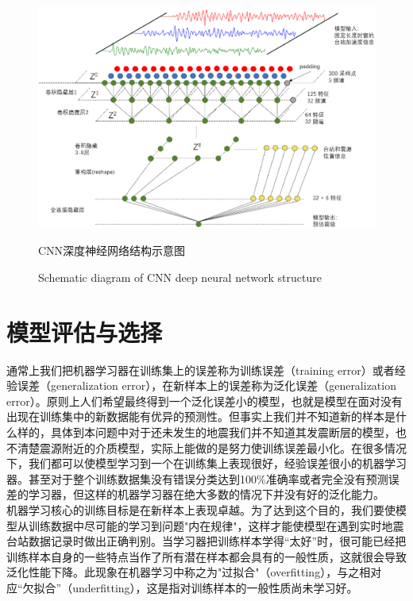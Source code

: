 \begin{figure}[h] 
\centering 
 \includegraphics[width=0.99\linewidth]{img/CNN.png} 
 \renewcommand{\figurename}{图} 
\caption{CNN深度神经网络结构示意图} 
\addtocounter{figure}{-1} \vspace{-5pt} 
\renewcommand{\figurename}{Fig} 
\caption{Schematic diagram of CNN deep neural network structure} 
\renewcommand{\figurename}{图} 
\label{fig:network-device-influence.png} 
\end{figure}
\section{模型评估与选择}
 \indent 通常上我们把机器学习器在训练集上的误差称为训练误差（training error）或者经验误差（generalization error），在新样本上的误差称为泛化误差（generalization error）。原则上人们希望最终得到一个泛化误差小的模型，也就是模型在面对没有出现在训练集中的新数据能有优异的预测性。但事实上我们并不知道新的样本是什么样的，具体到本问题中对于还未发生的地震我们并不知道其发震断层的模型，也不清楚震源附近的介质模型，实际上能做的是努力使训练误差最小化。在很多情况下，我们都可以使模型学习到一个在训练集上表现很好，经验误差很小的机器学习器。甚至对于整个训练数据集没有错误分类达到100\%准确率或者完全没有预测误差的学习器，但这样的机器学习器在绝大多数的情况下并没有好的泛化能力。\\
 \indent 机器学习核心的训练目标是在新样本上表现卓越。为了达到这个目的，我们要使模型从训练数据中尽可能的学习到问题"内在规律"，这样才能使模型在遇到实时地震台站数据记录时做出正确判别。当学习器把训练样本学得“太好”时，很可能已经把训练样本自身的一些特点当作了所有潜在样本都会具有的一般性质，这就很会导致泛化性能下降。此现象在机器学习中称之为"过拟合"（overfitting），与之相对应“欠拟合”（underfitting），这是指对训练样本的一般性质尚未学习好。
 
